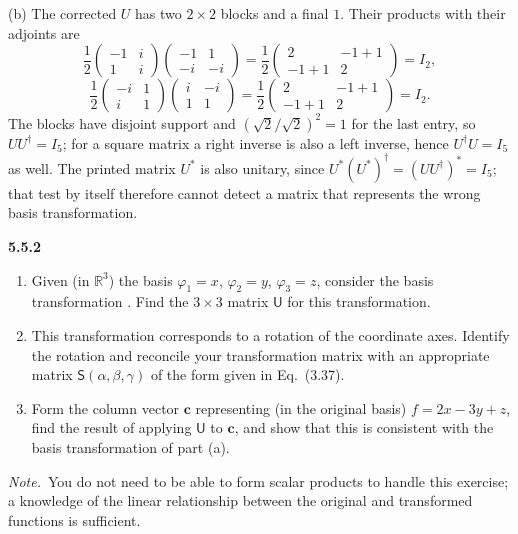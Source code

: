 (b) The corrected $U$ has two $2\times2$ blocks and a final $1$.
Their products with their adjoints are
\[
\frac12\begin{pmatrix}-1&i\\1&i\end{pmatrix}
\begin{pmatrix}-1&1\\-i&-i\end{pmatrix}
=\frac12\begin{pmatrix}2&-1+1\\-1+1&2\end{pmatrix}=I_2,
\]
\[
\frac12\begin{pmatrix}-i&1\\i&1\end{pmatrix}
\begin{pmatrix}i&-i\\1&1\end{pmatrix}
=\frac12\begin{pmatrix}2&-1+1\\-1+1&2\end{pmatrix}=I_2.
\]
The blocks have disjoint support and $(\sqrt2/\sqrt2)^2=1$ for the last
entry, so $UU^\dagger=I_5$; for a square matrix a right inverse is also
a left inverse, hence $U^\dagger U=I_5$ as well.
The printed matrix $U^*$ is also unitary, since
$U^*(U^*)^\dagger=(UU^\dagger)^*=I_5$; that test by itself therefore
cannot detect a matrix that represents the wrong basis transformation.

\par\bigskip
\noindent\textbf{5.5.2}\quad
\begin{enumerate}
\item[(a)] Given (in $\mathbb{R}^{3}$) the basis $\varphi_{1}=x$,
  $\varphi_{2}=y$, $\varphi_{3}=z$, consider the basis transformation
  . Find the $3\times3$ matrix $\mathsf{U}$ for
  this transformation.
\item[(b)] This transformation corresponds to a rotation of the coordinate
  axes. Identify the rotation and reconcile your transformation matrix with an
  appropriate matrix $\mathsf{S}(\alpha,\beta,\gamma)$ of the form given in
  Eq.~(3.37).
\item[(c)] Form the column vector $\mathbf{c}$ representing (in the original
  basis) $f=2x-3y+z$, find the result of applying $\mathsf{U}$ to
  $\mathbf{c}$, and show that this is consistent with the basis transformation
  of part (a).
\end{enumerate}
\emph{Note.}~You do not need to be able to form scalar products to handle this
exercise; a knowledge of the linear relationship between the original and
transformed functions is sufficient.
\solution
{}

